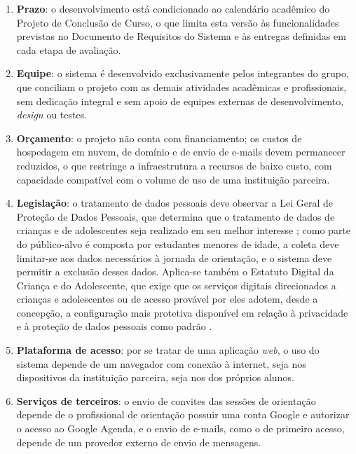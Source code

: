 \begin{enumerate}[label=\alph*)]
  \item \textbf{Prazo}: o desenvolvimento está condicionado ao calendário acadêmico do Projeto de Conclusão de Curso, o que limita esta versão às funcionalidades previstas no Documento de Requisitos do Sistema e às entregas definidas em cada etapa de avaliação.
  \item \textbf{Equipe}: o sistema é desenvolvido exclusivamente pelos integrantes do grupo, que conciliam o projeto com as demais atividades acadêmicas e profissionais, sem dedicação integral e sem apoio de equipes externas de desenvolvimento, \textit{design} ou testes.
  \item \textbf{Orçamento}: o projeto não conta com financiamento; os custos de hospedagem em nuvem, de domínio e de envio de e-mails devem permanecer reduzidos, o que restringe a infraestrutura a recursos de baixo custo, com capacidade compatível com o volume de uso de uma instituição parceira.
  \item \textbf{Legislação}: o tratamento de dados pessoais deve observar a Lei Geral de Proteção de Dados Pessoais, que determina que o tratamento de dados de crianças e de adolescentes seja realizado em seu melhor interesse \cite{brasil2018lgpd}; como parte do público-alvo é composta por estudantes menores de idade, a coleta deve limitar-se aos dados necessários à jornada de orientação, e o sistema deve permitir a exclusão desses dados. Aplica-se também o Estatuto Digital da Criança e do Adolescente, que exige que os serviços digitais direcionados a crianças e adolescentes ou de acesso provável por eles adotem, desde a concepção, a configuração mais protetiva disponível em relação à privacidade e à proteção de dados pessoais como padrão \cite{brasil2025lei15211}.
  \item \textbf{Plataforma de acesso}: por se tratar de uma aplicação \textit{web}, o uso do sistema depende de um navegador com conexão à internet, seja nos dispositivos da instituição parceira, seja nos dos próprios alunos.
  \item \textbf{Serviços de terceiros}: o envio de convites das sessões de orientação depende de o profissional de orientação possuir uma conta Google e autorizar o acesso ao Google Agenda, e o envio de e-mails, como o de primeiro acesso, depende de um provedor externo de envio de mensagens.
\end{enumerate}
